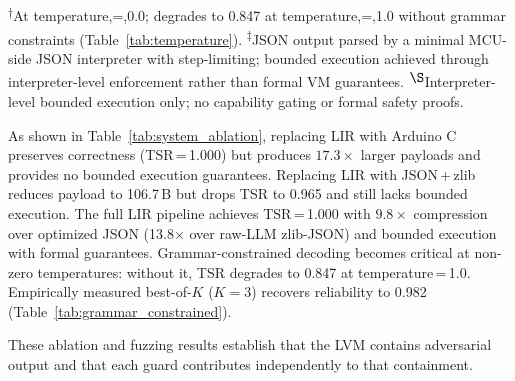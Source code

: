 \documentclass[a4paper,fleqn,longmktitle]{cas-dc}
\begin{document}
\begin{table}[t]
\centering
\caption{System-level pipeline ablation (113 tasks, temperature,=,0.0).}
\label{tab:system_ablation}
\footnotesize
{}\\[2pt]
{\footnotesize \textsuperscript{$\dagger$}At temperature,=,0.0; degrades to 0.847 at temperature,=,1.0 without grammar constraints (Table~\ref{tab:temperature}). \textsuperscript{$\ddagger$}JSON output parsed by a minimal MCU-side JSON interpreter with step-limiting; bounded execution achieved through interpreter-level enforcement rather than formal VM guarantees. \textsuperscript{$\S$}Interpreter-level bounded execution only; no capability gating or formal safety proofs.}
\end{table}

As shown in Table~\ref{tab:system_ablation}, replacing LIR with Arduino C preserves correctness (TSR\,=\,1.000) but produces $17.3\times$ larger payloads and provides no bounded execution guarantees. Replacing LIR with JSON\,+\,zlib reduces payload to 106.7\,B but drops TSR to 0.965 and still lacks bounded execution. The full LIR pipeline achieves TSR\,=\,1.000 with $9.8\times$ compression over optimized JSON (13.8$\times$ over raw-LLM zlib-JSON) and bounded execution with formal guarantees. Grammar-constrained decoding becomes critical at non-zero temperatures: without it, TSR degrades to 0.847 at temperature\,=\,1.0. Empirically measured best-of-$K$ ($K{=}3$) recovers reliability to 0.982 (Table~\ref{tab:grammar_constrained}).

These ablation and fuzzing results establish that the LVM contains adversarial output and that each guard contributes independently to that containment.
\end{document}
